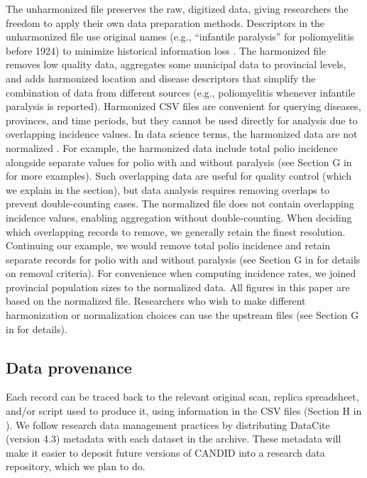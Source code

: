 \documentclass[10pt,letterpaper]{article}
\begin{document}
The unharmonized file preserves the raw, digitized data, giving researchers the freedom to apply their own data preparation methods. Descriptors in the unharmonized file use original names (e.g., ``infantile paralysis'' for poliomyelitis before 1924) to minimize historical information loss \cite{torres2022harmonization}. The harmonized file removes low quality data, aggregates some municipal data to provincial levels, and adds harmonized location and disease descriptors that simplify the combination of data from different sources (e.g., poliomyelitis whenever infantile paralysis is reported). Harmonized CSV files are convenient for querying diseases, provinces, and time periods, but they cannot be used directly for analysis due to overlapping incidence values. In data science terms, the harmonized data are not normalized \cite{tidydata,cheng2024general}. For example, the harmonized data include total polio incidence alongside separate values for polio with and without paralysis (see Section G in  for more examples). Such overlapping data are useful for quality control (which we explain in the  section), but data analysis requires removing overlaps to prevent double-counting cases. The normalized file does not contain overlapping incidence values, enabling aggregation without double-counting. When deciding which overlapping records to remove, we generally retain the finest resolution. Continuing our example, we would remove total polio incidence and retain separate records for polio with and without paralysis (see Section G in  for details on removal criteria). For convenience when computing incidence rates, we joined provincial population sizes to the normalized data. All figures in this paper are based on the normalized file. Researchers who wish to make different harmonization or normalization choices can use the upstream files (see Section G in  for details).

\subsection*{Data provenance}\label{sec:data-provenance}

Each record can be traced back to the relevant original scan, replica spreadsheet, and/or script used to produce it, using information in the CSV files (Section H in ). We follow research data management practices by distributing DataCite \cite{datacite_metadata_schema} (version 4.3) metadata with each dataset in the archive. These metadata will make it easier to deposit future versions of CANDID into a research data repository, which we plan to do.
\end{document}
